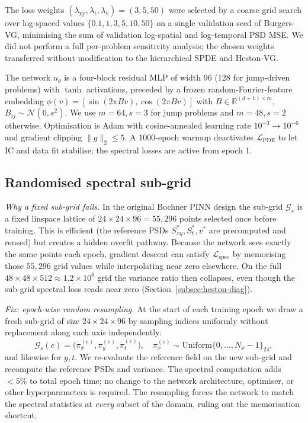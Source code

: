 \documentclass[review,12pt]{elsarticle}
\begin{document}
The loss weights
\((\lambda_{\mathrm{xy}}, \lambda_{\mathrm t}, \lambda_{\mathrm v}) = (3, 5, 50)\)
were selected by a coarse grid search over log-spaced values
\(\{0.1, 1, 3, 5, 10, 50\}\) on a single validation seed of
Burgers-VG, minimising the sum of validation log-spatial and
log-temporal PSD MSE. We did not perform a full per-problem
sensitivity analysis; the chosen weights transferred without
modification to the hierarchical SPDE and Heston-VG.

The network \(u_\theta\) is a four-block residual MLP of width 96
(128 for jump-driven problems) with \(\tanh\) activations, preceded
by a frozen random-Fourier-feature embedding
\(\phi(v) = [\sin(2\pi B v), \cos(2\pi B v)]\) with
\(B \in \mathbb R^{(d+1)\times m}\),
\(B_{ij} \sim \mathcal N(0, s^2)\). We use \(m=64, s=3\) for jump
problems and \(m=48, s=2\) otherwise. Optimisation is Adam with
cosine-annealed learning rate \(10^{-3} \to 10^{-6}\) and gradient
clipping \(\|g\|_2 \le 5\). A 1000-epoch warmup deactivates
\(\mathcal L_{\mathrm{PDE}}\) to let IC and data fit stabilise; the
spectral losses are active from epoch 1.

\subsection{Randomised spectral sub-grid}
\label{subsec:rand-subgrid}

\emph{Why a fixed sub-grid fails.} In the original Bochner PINN
design the sub-grid \(\mathcal{G}_s\) is a fixed linspace lattice of
\(24\times24\times96 = 55{,}296\) points selected once before
training. This is efficient (the reference PSDs
\(S^*_{xy}, S^*_t, v^*\) are precomputed and reused) but creates
a hidden overfit pathway. Because the network sees exactly the same
points each epoch, gradient descent can satisfy
\(\mathcal{L}_{\mathrm{spec}}\) by memorising those \(55{,}296\)
grid values while interpolating near zero elsewhere. On the full
\(48\times48\times512 \approx 1.2 \times 10^6\) grid the variance
ratio then collapses, even though the sub-grid spectral loss reads
near zero (Section~\ref{subsec:heston-diag}).

\emph{Fix: epoch-wise random resampling.} At the start of each
training epoch we draw a fresh sub-grid of size
\(24\times24\times96\) by sampling indices uniformly without
replacement along each axis independently:
\begin{equation}
 \mathcal{G}_s(e) =
 \bigl(\pi_x^{(e)}, \pi_y^{(e)}, \pi_t^{(e)}\bigr),
 \quad
 \pi_x^{(e)} \sim \mathrm{Uniform}\{0,\ldots,N_x{-}1\}_{24},
 \label{eq:rand-subgrid}
\end{equation}
and likewise for \(y, t\). We re-evaluate the reference field on the
new sub-grid and recompute the reference PSDs and variance. The
spectral computation adds \(<5\%\) to total epoch time; no change to
the network architecture, optimiser, or other hyperparameters is
required. The resampling forces the network to match the spectral
statistics at \emph{every} subset of the domain, ruling out the
memorisation shortcut.
\end{document}
